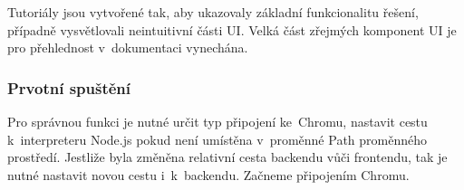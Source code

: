 \documentclass[12pt, a4paper, twoside]{article}
\begin{document}
	Tutoriály jsou vytvořené tak, aby ukazovaly základní funkcionalitu řešení, případně vysvětlovali neintuitivní části UI. Velká část zřejmých komponent UI je pro přehlednost v~dokumentaci vynechána.
	\subsubsection{Prvotní spuštění}
	\label{subsub_sec:firstRun}
	
	Pro správnou funkci je nutné určit typ připojení ke~Chromu, nastavit cestu k~interpreteru Node.js pokud není umístěna v~proměnné Path proměnného prostředí. Jestliže byla změněna relativní cesta backendu vůči frontendu, tak je nutné nastavit novou cestu i~k~backendu. Začneme připojením Chromu.
\end{document}
